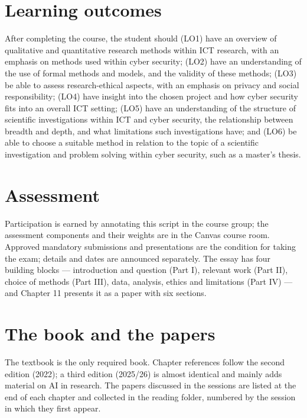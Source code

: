 \documentclass[11pt,a4paper,british,twoside=false,headings=small,chapterprefix=false,numbers=noenddot]{scrbook}
\begin{document}
\section*{Learning outcomes}

After completing the course, the student should (LO1) have an overview of qualitative and quantitative research methods within ICT research, with an emphasis on methods used within cyber security; (LO2) have an understanding of the use of formal methods and models, and the validity of these methods; (LO3) be able to assess research-ethical aspects, with an emphasis on privacy and social responsibility; (LO4) have insight into the chosen project and how cyber security fits into an overall ICT setting; (LO5) have an understanding of the structure of scientific investigations within ICT and cyber security, the relationship between breadth and depth, and what limitations such investigations have; and (LO6) be able to choose a suitable method in relation to the topic of a scientific investigation and problem solving within cyber security, such as a master's thesis.

\section*{Assessment}

Participation is earned by annotating this script in the course group; the assessment components and their weights are in the Canvas course room. Approved mandatory submissions and presentations are the condition for taking the exam; details and dates are announced separately. The essay has four building blocks --- introduction and question (Part I), relevant work (Part II), choice of methods (Part III), data, analysis, ethics and limitations (Part IV) --- and Chapter 11 presents it as a paper with six sections.

\section*{The book and the papers}

The textbook is the only required book. Chapter references follow the second edition (2022); a third edition (2025/26) is almost identical and mainly adds material on AI in research. The papers discussed in the sessions are listed at the end of each chapter and collected in the reading folder, numbered by the session in which they first appear.

\tableofcontents
\end{document}
